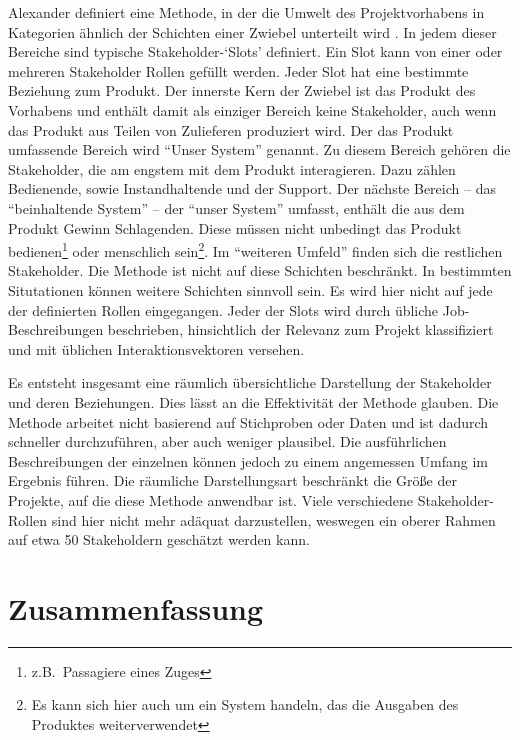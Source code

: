 Alexander definiert eine Methode, in der die Umwelt des Projektvorhabens in Kategorien ähnlich der Schichten einer Zwiebel unterteilt wird \cite{alexander}. In jedem dieser Bereiche sind typische Stakeholder-`Slots' definiert. Ein Slot kann von einer oder mehreren Stakeholder Rollen gefüllt werden. Jeder Slot hat eine bestimmte Beziehung zum Produkt.
Der innerste Kern der Zwiebel ist das Produkt des Vorhabens und enthält damit als einziger Bereich keine Stakeholder, auch wenn das Produkt aus Teilen von Zulieferen produziert wird. Der das
Produkt umfassende Bereich wird ``Unser System'' genannt. Zu diesem Bereich gehören die Stakeholder, die am engstem mit dem Produkt interagieren. Dazu zählen Bedienende, sowie Instandhaltende und der Support. Der nächste Bereich -- das ``beinhaltende System'' -- der ``unser System'' umfasst, enthält die aus dem Produkt Gewinn Schlagenden. Diese müssen nicht unbedingt das Produkt bedienen\footnote{z.B.\ Passagiere eines Zuges} oder menschlich
sein\footnote{Es kann sich hier auch um ein System handeln, das die Ausgaben des Produktes weiterverwendet}. Im ``weiteren Umfeld'' finden sich die restlichen Stakeholder. Die Methode ist nicht auf diese Schichten beschränkt. In bestimmten Situtationen können weitere Schichten sinnvoll sein. Es wird hier nicht auf jede der definierten Rollen eingegangen. Jeder der Slots wird durch übliche Job-Beschreibungen beschrieben, hinsichtlich der Relevanz zum Projekt klassifiziert und mit
üblichen Interaktionsvektoren versehen. 

Es entsteht insgesamt eine räumlich übersichtliche Darstellung der Stakeholder und deren Beziehungen. Dies lässt an die Effektivität der Methode glauben. Die Methode arbeitet nicht basierend auf Stichproben oder Daten und ist dadurch schneller durchzuführen, aber auch weniger plausibel. Die ausführlichen Beschreibungen der einzelnen können jedoch zu einem angemessen Umfang im Ergebnis führen. Die räumliche Darstellungsart beschränkt die Größe der Projekte, auf die diese
Methode anwendbar ist. Viele verschiedene Stakeholder-Rollen sind hier nicht mehr adäquat darzustellen, weswegen ein oberer Rahmen auf etwa 50 Stakeholdern geschätzt werden kann.

\section{Zusammenfassung}

